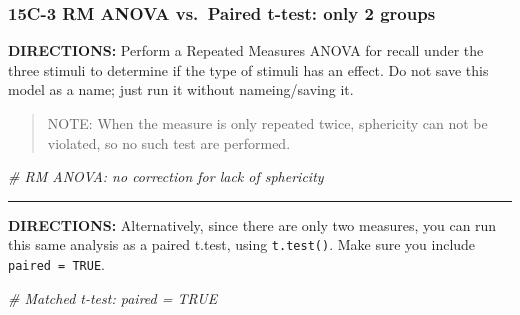 \documentclass[
]{article}
\newenvironment{Shaded}{\begin{snugshade}}{\end{snugshade}}
\newcommand{\CommentTok}[1]{\textcolor[rgb]{0.56,0.35,0.01}{\textit{#1}}}
\begin{document}
\clearpage

\hypertarget{c-3-rm-anova-vs.-paired-t-test-only-2-groups}{%
\subsubsection{15C-3 RM ANOVA vs.~Paired t-test: only 2
groups}\label{c-3-rm-anova-vs.-paired-t-test-only-2-groups}}

\textbf{DIRECTIONS:} Perform a Repeated Measures ANOVA for recall under
the three stimuli to determine if the type of stimuli has an effect. Do
not save this model as a name; just run it without nameing/saving it.

\begin{quote}
NOTE: When the measure is only repeated twice, sphericity can not be
violated, so no such test are performed.
\end{quote}

\begin{Shaded}
\begin{Highlighting}[]
\CommentTok{# RM ANOVA: no correction for lack of sphericity }
\end{Highlighting}
\end{Shaded}

\begin{center}\rule{0.5\linewidth}{\linethickness}\end{center}

\textbf{DIRECTIONS:} Alternatively, since there are only two measures,
you can run this same analysis as a paired t.test, using
\texttt{t.test()}. Make sure you include \texttt{paired\ =\ TRUE}.

\begin{Shaded}
\begin{Highlighting}[]
\CommentTok{# Matched t-test: paired = TRUE}
\end{Highlighting}
\end{Shaded}
\end{document}
